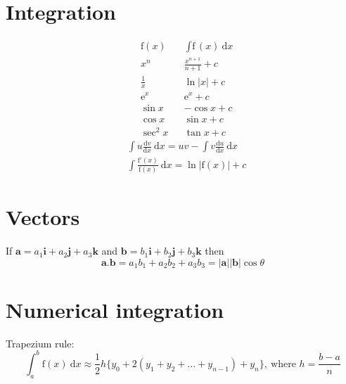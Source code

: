 \documentclass[a4paper]{article}
\begin{document}
\section{Integration}
\begin{align}
    &\mathrm{f}(x)  &  &\text{\(\int\)f}(x) \ \mathrm{d}x \nonumber \\
    &x^n            &  &\frac{x^{n+1}}{n+1} + c \\
    &\frac{1}{x}    &  &\ln|x| + c \\
    &\mathrm{e}^x   &  &\mathrm{e}^x + c \\
    &\sin{x}        &  &-\cos{x} + c \\
    &\cos{x}        &  &\sin{x} + c \\
    &\sec^2 x       &  &\tan{x} + c
\end{align}
\begin{align}
    &\int u \frac{\mathrm{d}v}{\mathrm{d}x} \ \mathrm{d}x = uv - \int v \frac{\mathrm{d}u}{\mathrm{d}x} \ \mathrm{d}x \\
    &\int \frac{\mathrm{f}'(x)}{\mathrm{f}(x)} \ \mathrm{d}x = \ln{|\mathrm{f}(x)|} + c
\end{align}

\section{Vectors}
\quad \enspace{}If \(\mathbf{a} = a_1\mathbf{i} + a_2\mathbf{j} + a_3\mathbf{k}\) and \(\mathbf{b} = b_1\mathbf{i} + b_2\mathbf{j} + b_3\mathbf{k}\) then
\begin{equation}
    \mathbf{a.b} = a_1 b_1 + a_2 b_2 + a_3 b_3 = |\mathbf{a}| |\mathbf{b}| \cos \theta
\end{equation}

\section{Numerical integration}
\quad \enspace{}Trapezium rule:
\begin{equation}
    \int_a^{b} \mathrm{f}(x) \ \mathrm{d}x \approx \frac{1}{2}h\{y_0 + 2(y_1 + y_2 + \dots + y_{n-1}) + y_n\}, \ \text{where \(h = \frac{b-a}{n}\)}
\end{equation}
\end{document}
